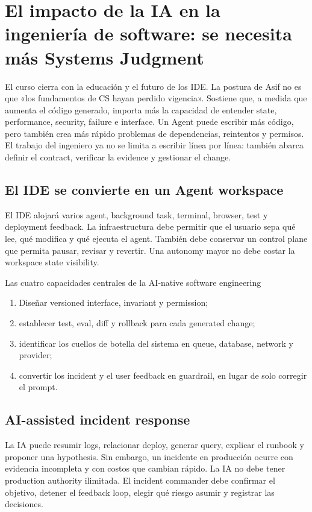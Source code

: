 \section{El impacto de la IA en la ingeniería de software: se necesita más Systems Judgment}

El curso cierra con la educación y el futuro de los IDE. La postura de Asif no es que «los fundamentos de CS hayan perdido vigencia». Sostiene que, a medida que aumenta el código generado, importa más la capacidad de entender state, performance, security, failure e interface. Un Agent puede escribir más código, pero también crea más rápido problemas de dependencias, reintentos y permisos. El trabajo del ingeniero ya no se limita a escribir línea por línea: también abarca definir el contract, verificar la evidence y gestionar el change.

\subsection{El IDE se convierte en un Agent workspace}

El IDE alojará varios agent, background task, terminal, browser, test y deployment feedback. La infraestructura debe permitir que el usuario sepa qué lee, qué modifica y qué ejecuta el agent. También debe conservar un control plane que permita pausar, revisar y revertir. Una autonomy mayor no debe costar la workspace state visibility.

\begin{importantbox}{Las cuatro capacidades centrales de la AI-native software engineering}
\begin{enumerate}
  \item Diseñar versioned interface, invariant y permission;
  \item establecer test, eval, diff y rollback para cada generated change;
  \item identificar los cuellos de botella del sistema en queue, database, network y provider;
  \item convertir los incident y el user feedback en guardrail, en lugar de solo corregir el prompt.
\end{enumerate}
\end{importantbox}

\subsection{AI-assisted incident response}

La IA puede resumir logs, relacionar deploy, generar query, explicar el runbook y proponer una hypothesis. Sin embargo, un incidente en producción ocurre con evidencia incompleta y con costos que cambian rápido. La IA no debe tener production authority ilimitada. El incident commander debe confirmar el objetivo, detener el feedback loop, elegir qué riesgo asumir y registrar las decisiones.

